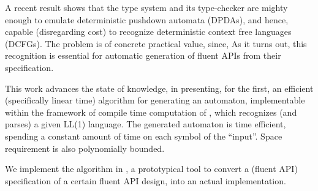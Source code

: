 
A recent result shows that the \Java type system and its type-checker are
mighty enough to emulate deterministic pushdown automata (DPDAs), and hence,
capable (disregarding cost) to recognize deterministic context free
languages (DCFGs). The problem is of concrete practical value, since, As it
turns out, this recognition is essential for automatic generation of fluent
APIs from their specification. 

This work advances the state of knowledge, in presenting,  for the first,  an
efficient (specifically linear time) algorithm for generating an automaton, 
implementable within the framework of compile time computation of \Java, which
recognizes (and parses) a given LL(1) language. The generated automaton is 
time efficient, spending a constant amount of time on each symbol of the ``input''. 
Space requirement is also polynomially bounded. 

We implement the algorithm in \Fajita, a prototypical tool to convert a (fluent
API) specification of a certain fluent API design, into an actual implementation. 



